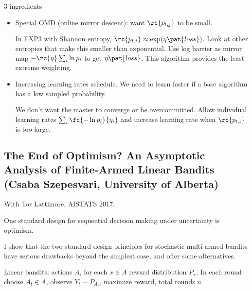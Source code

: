 3 ingredients
\begin{itemize}
\item
Special OMD (online mirror descent): want $\rc{p_{t,j}}$ to be small.

In EXP3 with Shannon entropy, $\rc{p_{t,i}}\approx \exp(\eta\pat{loss})$. Look at other entropies that make this smaller than exponential. Use log barrier as mirror map $-\rc{\eta}\sum_i \ln p_i$ to get $\eta\pat{loss}$.
This algorithm provides the least extreme weighting. 
\item
Increasing learning rates schedule. We need to learn faster if a base algorithm has a low sampled probability. 

We don't want the master to converge or be overcommitted. Allow individual learning rates $\sum_i\fc{-\ln p_i}{\eta_i}$ and increase learning rate when $\rc{p_{t,i}}$ is too large.
\end{itemize}


\subsection{The End of Optimism? An Asymptotic Analysis of Finite-Armed Linear Bandits
(Csaba Szepesvari, University of Alberta)}

%

With Tor Lattimore, AISTATS 2017.

One standard design for sequential decision making under uncertainty is optimism. 

I show that the two standard design principles for stochastic multi-armed bandits have serious drawbacks beyond the simplest case, and offer some alternatives.

Linear bandits: actions $A$, for each $x\in A$ reward distribution $P_\pi$. In each round choose $A_t\in A$, observe $Y_t\sim P_{A_t}$, maximize reward, total rounds $n$. 

